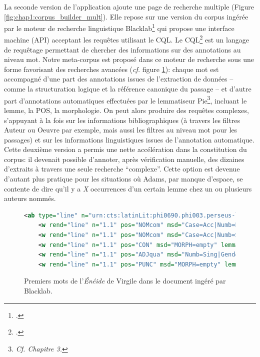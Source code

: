La seconde version de l'application ajoute une page de recherche multiple (Figure \ref{fig:chap1:corpus_builder_mult}). Elle repose sur une version du corpus ingérée par le moteur de recherche linguistique Blacklab\footcite{de2017creating} qui propose une interface machine (API) acceptant les requêtes utilisant le \acrfull{CQL}. Le \acrshort{CQL}\footcite{christ1994modular} est un langage de requêtage permettant de chercher des informations sur des annotations au niveau mot. Notre meta-corpus est proposé dans ce moteur de recherche sous une forme favorisant des recherches avancées (\textit{cf.} figure \ref{fig:chap1:armavirumque}): chaque mot est accompagné d'une part des annotations issues de l'extraction de données -- comme la structuration logique et la référence canonique du passage -- et d'autre part d'annotations automatiques effectuées par le lemmatiseur Pie\footnote{\textit{Cf. Chapitre 3.}}, incluant le lemme, la POS, la morphologie. On peut alors produire des requêtes complexes, s'appuyant à la fois sur les informations bibliographiques (à travers les filtres Auteur ou Oeuvre par exemple, mais aussi les filtres au niveau mot pour les passages) et sur les informations linguistiques issues de l'annotation automatique. Cette deuxième version a permis une nette accélération dans la constitution du corpus: il devenait possible d'annoter, après vérification manuelle, des dizaines d'extraits à travers une seule recherche \enquote{complexe}. Cette option est devenue d'autant plus pratique pour les situations où Adams, par manque d'espace, se contente de dire qu'il y a \textit{X} occurrences d'un certain lemme chez un ou plusieurs auteurs nommés.

\begin{figure}
    \begin{lstlisting}[language=XML]
<ab type="line" n="urn:cts:latinLit:phi0690.phi003.perseus-lat2:1.1">
    <w rend="line" n="1.1" pos="NOMcom" msd="Case=Acc|Numb=Plur" lemma="arma">Arma</w>
    <w rend="line" n="1.1" pos="NOMcom" msd="Case=Acc|Numb=Sing" lemma="uir">virumque</w>
    <w rend="line" n="1.1" pos="CON" msd="MORPH=empty" lemma="que">{virumque}</w>
    <w rend="line" n="1.1" pos="ADJqua" msd="Numb=Sing|Gend=MascNeut|Deg=Pos|Mood=Ind|Tense=Pres|Voice=Act|Person=1" lemma="cano">cano</w>
    <w rend="line" n="1.1" pos="PUNC" msd="MORPH=empty" lemma=",">,</w>
    \end{lstlisting}
    \caption{Premiers mots de l'\textit{Énéide} de Virgile dans le document ingéré par Blacklab.}
    \label{fig:chap1:armavirumque}
\end{figure}

